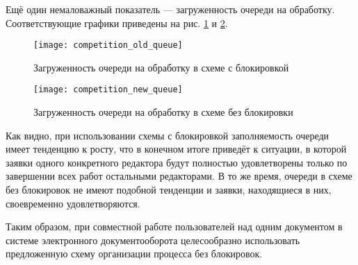 \vspace{\baselineskip}
Ещё один немаловажный показатель --- загруженность очереди на обработку. Соответствующие графики приведены на рис. \ref{img:competition_old_queue} и \ref{img:competition_new_queue}.

\begin{figure}[h!]
  \centering
  \texttt{[image: competition\_old\_queue]}
  \caption{Загруженность очереди на обработку в схеме с блокировкой}
  \label{img:competition_old_queue}
\end{figure}

\begin{figure}[h!]
  \centering
  \texttt{[image: competition\_new\_queue]}
  \caption{Загруженность очереди на обработку в схеме без блокировки}
  \label{img:competition_new_queue}
\end{figure}

\vspace{\baselineskip}
Как видно, при использовании схемы с блокировкой заполняемость очереди имеет тенденцию к росту, что в конечном итоге приведёт к ситуации, в которой заявки одного конкретного редактора будут полностью удовлетворены только по завершении всех работ остальными редакторами. В то же время, очереди в схеме без блокировок не имеют подобной тенденции и заявки, находящиеся в них, своевременно удовлетворяются.

\vspace{\baselineskip}
Таким образом, при совместной работе пользователей над одним документом в системе электронного документооборота целесообразно использовать предложенную схему организации процесса без блокировок.